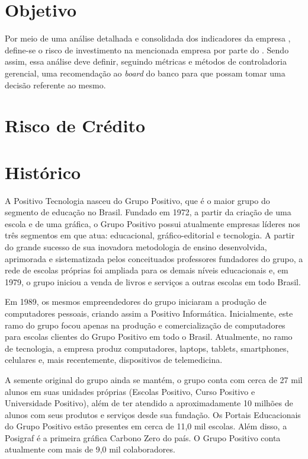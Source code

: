 \section{Objetivo}

Por meio de uma análise detalhada e consolidada dos indicadores da empresa \nomeCompletoPositivo{}, define-se o risco de investimento na mencionada empresa por parte do \emph{\nomeDoBanco{}}. Sendo assim, essa análise deve definir, seguindo métricas e métodos de controladoria gerencial, uma recomendação ao \emph{board} do banco para que possam tomar uma decisão referente ao mesmo.

\section{Risco de Crédito}

\section{Histórico}
A Positivo Tecnologia nasceu do Grupo Positivo, que é o maior grupo do segmento de educação no Brasil. Fundado em 1972, a partir da criação de uma escola e de uma gráfica, o Grupo Positivo possui atualmente empresas líderes nos três segmentos em que atua: educacional, gráfico-editorial e tecnologia. A partir do grande sucesso de sua inovadora metodologia de ensino desenvolvida, aprimorada e sistematizada pelos conceituados professores fundadores do grupo, a rede de escolas próprias foi ampliada para os demais níveis educacionais e, em 1979, o grupo iniciou a venda de livros e serviços a outras escolas em todo Brasil.

Em 1989, os mesmos empreendedores do grupo iniciaram a produção de computadores pessoais, criando assim a Positivo Informática. Inicialmente, este ramo do grupo focou apenas na produção e comercialização de computadores para escolas clientes do Grupo Positivo em todo o Brasil. Atualmente, no ramo de tecnologia, a empresa produz computadores, laptops, tablets, smartphones, celulares e, mais recentemente, dispositivos de telemedicina. 

A semente original do grupo ainda se mantém, o grupo conta com cerca de 27 mil alunos em suas unidades próprias (Escolas Positivo, Curso Positivo e Universidade Positivo), além de ter atendido a aproximadamente 10 milhões de alunos com seus produtos e serviços desde sua fundação. Os Portais Educacionais do Grupo Positivo estão presentes em cerca de 11,0 mil escolas. Além disso, a Posigraf é a primeira gráfica Carbono Zero do país. O Grupo Positivo conta atualmente com mais de 9,0 mil colaboradores.

